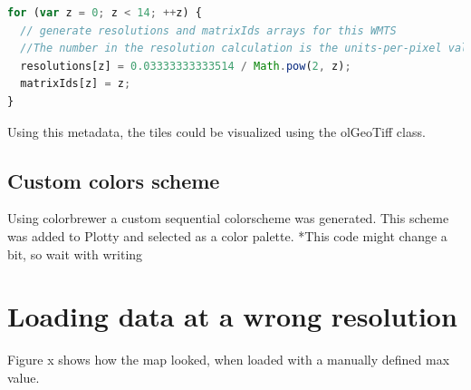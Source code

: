 \begin{lstlisting}[language=JavaScript, caption={The JavaScript in the project}, label= VoresJS,escapechar=|]
for (var z = 0; z < 14; ++z) {
  // generate resolutions and matrixIds arrays for this WMTS
  //The number in the resolution calculation is the units-per-pixel value at zoomlayer 0 in the xml file generated by gdal2tiles
  resolutions[z] = 0.03333333333514 / Math.pow(2, z);
  matrixIds[z] = z;
}
\end{lstlisting}
Using this metadata, the tiles could be visualized using the olGeoTiff class. 



\subsection{Custom colors scheme}
Using colorbrewer a custom sequential colorscheme was generated. This scheme was added to Plotty and selected as a color palette.
*This code might change a bit, so wait with writing  


\section{Loading data at a wrong resolution}
Figure x shows how the map looked, when loaded with a manually defined max value.
 
